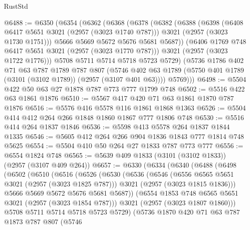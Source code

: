 \begin{lexlean}{RustStd}
\begin{coremodule}
@6488 := @6350
    (@6354
      (@6362
        (@6368
          (@6378
            (@6382
              (@6388
                (@6398
                  (@6408 @6417 @5651 @3021 (@2957 (@3023 @1740 @787)))
                  @3021
                  (@2957 (@3023 @1730 @1751)))
                @5666
                @5669
                @5672
                @5676
                @5681
                @5687))
            (@6406 @1769 @748 @6417 @5651 @3021 (@2957 (@3023 @1770 @787)))
            @3021
            (@2957 (@3023 @1722 @1776)))
          @5708
          @5711
          @5714
          @5718
          @5723
          @5729)
        (@5736
          @1786
          @402
          @71
          @63
          @787
          @1789
          @787
          @807
          (@5746 @402 @63 @1789 (@5750 @401 @1789 (@3101 (@3102 @1789)) (@2957 (@3107 @401 @63))))
          @5769)))
@6498 := @5504 @422 @50 @63 @27 @1878 @787 @773 @777 @1799 @748
@6502 := @5516 @422 @63 @1861 @1876
@6510 := @5567 @417 @420 @71 @63 @1861 @1870 @787 @1876
@6516 := @5576 @416 @5578 @116 @1861 @1868 @1363
@6526 := @5504 @414 @412 @264 @266 @1848 @1860 @1867 @777 @1806 @748
@6530 := @5516 @414 @264 @1837 @1846
@6536 := @5598 @413 @5578 @264 @1837 @1844 @1335
@6546 := @5605 @412 @264 @266 @904 @1836 @1843 @777 @1814 @748 @5625
@6554 := @5504 @410 @50 @264 @27 @1833 @787 @773 @777
@6556 := @6554 @1824 @748
@6565 := @5639 @409 @1833 (@3101 (@3102 @1833)) (@2957 (@3107 @409 @264))
@6657 := @6330
    (@6334
      (@6340
        (@6488
          (@6498
            (@6502
              (@6510
                (@6516
                  (@6526
                    (@6530
                      (@6536
                        (@6546
                          (@6556 @6565 @5651 @3021 (@2957 (@3023 @1825 @787)))
                          @3021
                          (@2957 (@3023 @1815 @1836)))
                        @5666
                        @5669
                        @5672
                        @5676
                        @5681
                        @5687))
                    (@6554 @1853 @748 @6565 @5651 @3021 (@2957 (@3023 @1854 @787)))
                    @3021
                    (@2957 (@3023 @1807 @1860)))
                  @5708
                  @5711
                  @5714
                  @5718
                  @5723
                  @5729)
                (@5736
                  @1870
                  @420
                  @71
                  @63
                  @787
                  @1873
                  @787
                  @807
                  (@5746

\end{coremodule}
\end{lexlean}
